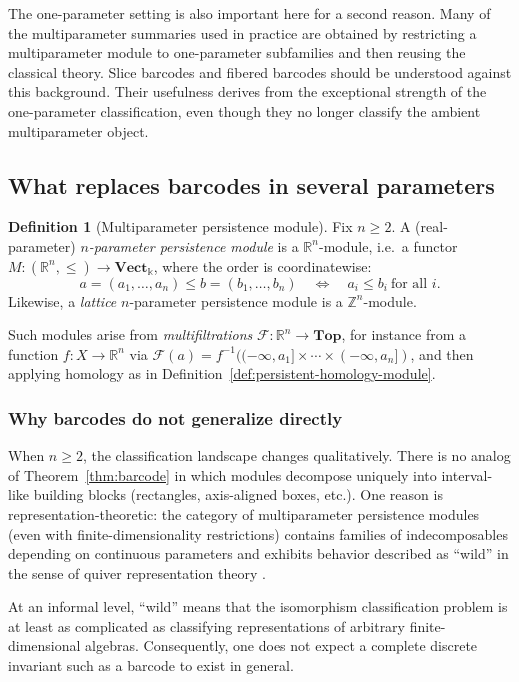 \documentclass[11pt]{article}
\newcommand{\kk}{\Bbbk}
\newcommand{\bbb}[1]{\mathbb{#1}}
\theoremstyle{definition}
\newtheorem{defn}[theorem]{Definition}
\theoremstyle{remark}
\begin{document}
The one-parameter setting is also important here for a second reason.  Many of the multiparameter summaries used in practice are obtained by restricting a multiparameter module to one-parameter subfamilies and then reusing the classical theory.  Slice barcodes and fibered barcodes should be understood against this background.  Their usefulness derives from the exceptional strength of the one-parameter classification, even though they no longer classify the ambient multiparameter object.

\subsection{What replaces barcodes in several parameters}

\begin{defn}[Multiparameter persistence module]\label{def:multi-parameter-module}
	Fix $n\geq 2$.  A (real-parameter) \emph{$n$-parameter persistence module} is a
	$\bbb{R}^n$-module, i.e.\ a functor $M\colon (\bbb{R}^n,\leq)\to\mathbf{Vect}_{\kk}$,
	where the order is coordinatewise:
	\[
	a=(a_1,\dots,a_n)\leq b=(b_1,\dots,b_n)\quad\Longleftrightarrow\quad
	a_i\leq b_i\ \text{for all }i.
	\]
	Likewise, a \emph{lattice} $n$-parameter persistence module is a $\bbb{Z}^n$-module.
\end{defn}

Such modules arise from \emph{multifiltrations} $\mathcal{F}\colon \bbb{R}^n\to
\mathbf{Top}$, for instance from a function $f\colon X\to \bbb{R}^n$ via
$\mathcal{F}(a)=f^{-1}((-\infty,a_1]\times\cdots\times(-\infty,a_n])$, and then
applying homology as in Definition~\ref{def:persistent-homology-module}.

\subsubsection*{Why barcodes do not generalize directly}

When $n\geq 2$, the classification landscape changes qualitatively.  There is no
analog of Theorem~\ref{thm:barcode} in which modules decompose uniquely into
interval-like building blocks (rectangles, axis-aligned boxes, etc.).  One reason is
representation-theoretic: the category of multiparameter persistence modules (even
with finite-dimensionality restrictions) contains families of indecomposables
depending on continuous parameters and exhibits behavior described as ``wild'' in
the sense of quiver representation theory \cite{CZ09,Oud15}.

At an informal level, ``wild'' means that the isomorphism classification problem is
at least as complicated as classifying representations of arbitrary finite-dimensional
algebras.  Consequently, one does not expect a complete discrete invariant such as a
barcode to exist in general.
\end{document}
